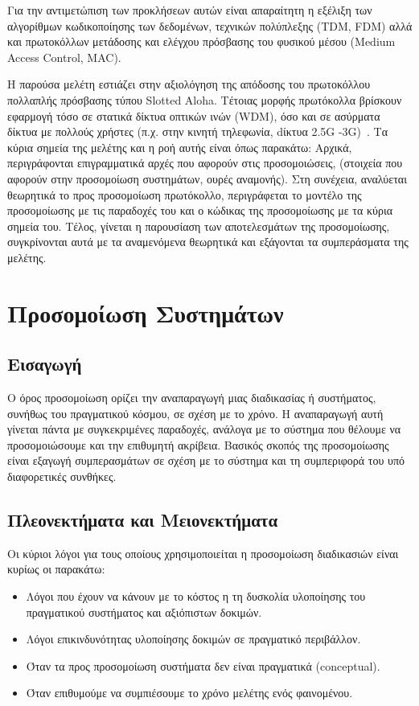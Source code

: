 \documentclass[12pt]{report}
\begin{document}
Για την αντιμετώπιση των προκλήσεων αυτών είναι απαραίτητη η εξέλιξη των αλγορίθμων κωδικοποίησης των δεδομένων, τεχνικών πολύπλεξης (\textlatin{TDM, FDM}) αλλά και πρωτοκόλλων μετάδοσης και ελέγχου πρόσβασης του φυσικού μέσου (\textlatin{Medium Access Control, MAC}).

Η παρούσα μελέτη εστιάζει στην αξιολόγηση της απόδοσης του πρωτοκόλλου πολλαπλής πρόσβασης τύπου \textlatin{Slotted Aloha}. Τέτοιας μορφής πρωτόκολλα βρίσκουν εφαρμογή τόσο σε στατικά δίκτυα οπτικών ινών (\textlatin{WDM}), όσο και σε ασύρματα δίκτυα με πολλούς χρήστες (π.χ. στην κινητή τηλεφωνία, dίκτυα \textlatin{2.5G -3G})~\cite{wiki:03}. Τα κύρια σημεία της μελέτης και η ροή αυτής είναι όπως παρακάτω: Αρχικά, περιγράφονται επιγραμματικά αρχές που αφορούν στις προσομοιώσεις, (στοιχεία που αφορούν στην προσομοίωση συστημάτων, ουρές αναμονής). Στη συνέχεια, αναλύεται θεωρητικά το προς προσομοίωση πρωτόκολλο, περιγράφεται το μοντέλο της προσομοίωσης με τις παραδοχές του και ο κώδικας της προσομοίωσης με τα κύρια σημεία του. Τέλος, γίνεται η παρουσίαση των αποτελεσμάτων της προσομοίωσης, συγκρίνονται αυτά με τα αναμενόμενα θεωρητικά και εξάγονται τα συμπεράσματα της μελέτης.

\section{Προσομοίωση Συστημάτων}
\subsection{Εισαγωγή}
Ο όρος προσομοίωση ορίζει την αναπαραγωγή μιας διαδικασίας ή συστήματος, συνήθως του πραγματικού κόσμου, σε σχέση με το χρόνο. Η αναπαραγωγή αυτή γίνεται πάντα με συγκεκριμένες παραδοχές, ανάλογα με το σύστημα που θέλουμε να προσομοιώσουμε και την επιθυμητή ακρίβεια. Βασικός σκοπός της προσομοίωσης είναι εξαγωγή συμπερασμάτων σε σχέση με το σύστημα και τη συμπεριφορά του υπό διαφορετικές συνθήκες.

\subsection{Πλεονεκτήματα και Μειονεκτήματα}
Οι κύριοι λόγοι για τους οποίους χρησιμοποιείται η προσομοίωση διαδικασιών είναι κυρίως οι παρακάτω:

\begin{itemize}
  \item Λόγοι που έχουν να κάνουν με το κόστος η τη δυσκολία υλοποίησης του πραγματικού συστήματος και αξιόπιστων δοκιμών.
  \item Λόγοι επικινδυνότητας υλοποίησης δοκιμών σε πραγματικό περιβάλλον.
  \item Όταν τα προς προσομοίωση συστήματα δεν είναι πραγματικά (\textlatin{conceptual}).
  \item Όταν επιθυμούμε να συμπιέσουμε το χρόνο μελέτης ενός φαινομένου.
\end{itemize}
\end{document}
